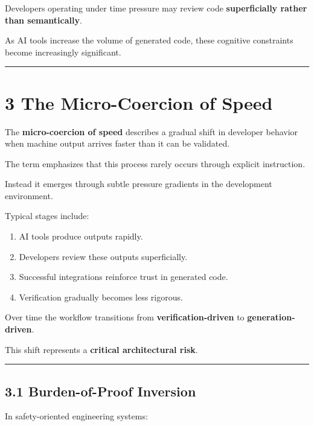 \documentclass[
]{article}
\providecommand{\tightlist}{%
  \setlength{\itemsep}{0pt}\setlength{\parskip}{0pt}}
\begin{document}
Developers operating under time pressure may review code
\textbf{superficially rather than semantically}.

As AI tools increase the volume of generated code, these cognitive
constraints become increasingly significant.

\begin{center}\rule{0.5\linewidth}{0.5pt}\end{center}

\section{3 The Micro-Coercion of
Speed}\label{3-the-micro-coercion-of-speed}

The \textbf{micro-coercion of speed} describes a gradual shift in
developer behavior when machine output arrives faster than it can be
validated.

The term emphasizes that this process rarely occurs through explicit
instruction.

Instead it emerges through subtle pressure gradients in the development
environment.

Typical stages include:

\begin{enumerate}
\def\labelenumi{\arabic{enumi}.}
\tightlist
\item
  AI tools produce outputs rapidly.
\item
  Developers review these outputs superficially.
\item
  Successful integrations reinforce trust in generated code.
\item
  Verification gradually becomes less rigorous.
\end{enumerate}

Over time the workflow transitions from \textbf{verification-driven} to
\textbf{generation-driven}.

This shift represents a \textbf{critical architectural risk}.

\begin{center}\rule{0.5\linewidth}{0.5pt}\end{center}

\subsection{3.1 Burden-of-Proof
Inversion}\label{31-burden-of-proof-inversion}

In safety-oriented engineering systems:
\end{document}
